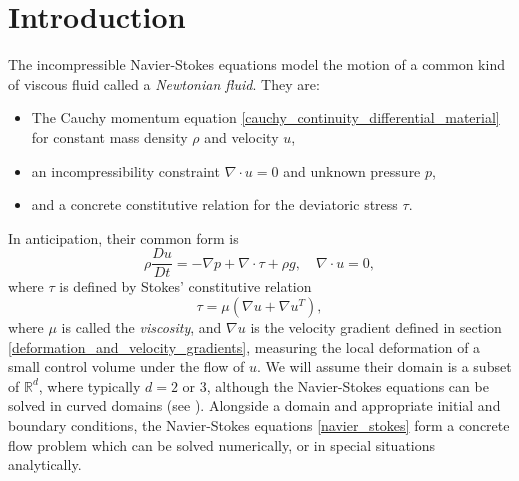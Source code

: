 
\section{Introduction}
The incompressible Navier-Stokes equations model the motion of a common kind of viscous fluid called a \textit{Newtonian fluid}.
They are:
\begin{itemize}
\item The Cauchy momentum equation \eqref{cauchy_continuity_differential_material} for constant mass density $\rho$ and velocity $u$,
\item an incompressibility constraint $\nabla\cdot u = 0$ and unknown pressure $p$,
\item and a concrete constitutive relation for the deviatoric stress $\tau$.
\end{itemize}
In anticipation, their common form is
\begin{equation}\label{navier_stokes}
    \rho\frac{Du}{Dt} = - \nabla p + \nabla\cdot\tau + \rho g,\quad \nabla\cdot u = 0,
\end{equation}
where $\tau$ is defined by Stokes' constitutive relation
\begin{equation}\label{stokes_constitutive_relation}
    \tau = \mu\left(\nabla u + \nabla u^T\right),
\end{equation}
where $\mu$ is called the \textit{viscosity}, and $\nabla u$ is the velocity gradient defined in section \ref{deformation_and_velocity_gradients},
measuring the local deformation of a small control volume under
the flow of $u$. We will assume their domain is a subset of $\mathbb{R}^d$, where typically $d = 2$ or $3$, although the Navier-Stokes equations can be solved
in curved domains (see \cite{stam}).
Alongside a domain and appropriate initial and boundary conditions, the Navier-Stokes equations \eqref{navier_stokes}
form a concrete flow problem which
can be solved numerically, or in special situations analytically.

